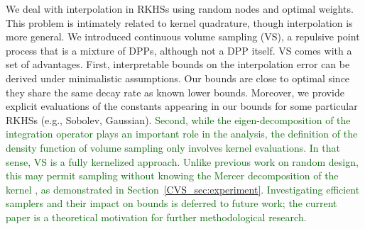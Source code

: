 \documentclass[twoside,11pt]{book}
\newcommand{\rev}[1]{\textcolor{darkgreen}{#1}}
\numberwithin{theorem}{chapter}
\numberwithin{definition}{chapter}
\numberwithin{proposition}{chapter}
\numberwithin{corollary}{chapter}
\numberwithin{example}{chapter}
\numberwithin{lemma}{chapter}
\DeclareMathOperator{\X}{\mathcal{X}}
\begin{document}






We deal with interpolation in RKHSs using random nodes and optimal weights. This problem is intimately related to kernel quadrature, though interpolation is more general.
We introduced continuous volume sampling (VS), a repulsive point process that is a mixture of DPPs, although not a DPP itself.
VS comes with a set of advantages. First, interpretable bounds on the interpolation error can be derived under minimalistic assumptions. Our bounds are close to optimal since they share the same decay rate as known lower bounds. Moreover, we provide explicit evaluations of the constants appearing in our bounds for some particular RKHSs (e.g., Sobolev, Gaussian).
\rev{
Second, while the eigen-decomposition of the integration operator plays an important role in the analysis, the definition of the density function of volume sampling only involves kernel evaluations. In that sense, VS is a fully kernelized approach. Unlike previous work on random design, this may permit sampling without knowing the Mercer decomposition of the kernel \citep{ReGh19}, as demonstrated in Section~\ref{CVS_sec:experiment}. Investigating efficient samplers and their impact on bounds is deferred to future work; the current paper is a theoretical motivation for further methodological research.
}
\end{document}
